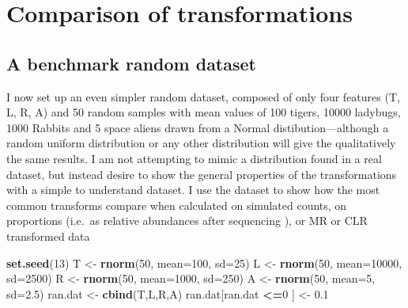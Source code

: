 \documentclass[onecolumn]{book}
\newenvironment{Shaded}{\begin{snugshade}}{\end{snugshade}}
\newcommand{\DataTypeTok}[1]{\textcolor[rgb]{0.13,0.29,0.53}{#1}}
\newcommand{\DecValTok}[1]{\textcolor[rgb]{0.00,0.00,0.81}{#1}}
\newcommand{\FloatTok}[1]{\textcolor[rgb]{0.00,0.00,0.81}{#1}}
\newcommand{\KeywordTok}[1]{\textcolor[rgb]{0.13,0.29,0.53}{\textbf{#1}}}
\newcommand{\NormalTok}[1]{#1}
\newcommand{\OperatorTok}[1]{\textcolor[rgb]{0.81,0.36,0.00}{\textbf{#1}}}
\newcommand{\StringTok}[1]{\textcolor[rgb]{0.31,0.60,0.02}{#1}}
\theoremstyle{definition}
\theoremstyle{definition}
\theoremstyle{definition}
\theoremstyle{remark}
\begin{document}
\hypertarget{comparison-of-transformations}{%
\section{Comparison of
transformations}\label{comparison-of-transformations}}

\hypertarget{a-benchmark-random-dataset}{%
\subsection{A benchmark random
dataset}\label{a-benchmark-random-dataset}}

I now set up an even simpler random dataset, composed of only four
features (T, L, R, A) and 50 random samples with mean values of 100
tigers, 10000 ladybugs, 1000 Rabbits and 5 space aliens drawn from a
Normal distibution---although a random uniform distribution or any other
distribution will give the qualitatively the same results. I am not
attempting to mimic a distribution found in a real dataset, but instead
desire to show the general properties of the transformations with a
simple to understand dataset. I use the dataset to show how the most
common transforms compare when calculated on simulated counts, on
proportions (i.e.~as relative abundances after sequencing ), or MR or
CLR transformed data

\begin{Shaded}
\begin{Highlighting}[]
\KeywordTok{set.seed}\NormalTok{(}\DecValTok{13}\NormalTok{)}
\NormalTok{T <-}\StringTok{ }\KeywordTok{rnorm}\NormalTok{(}\DecValTok{50}\NormalTok{, }\DataTypeTok{mean=}\DecValTok{100}\NormalTok{, }\DataTypeTok{sd=}\DecValTok{25}\NormalTok{)}
\NormalTok{L <-}\StringTok{ }\KeywordTok{rnorm}\NormalTok{(}\DecValTok{50}\NormalTok{, }\DataTypeTok{mean=}\DecValTok{10000}\NormalTok{, }\DataTypeTok{sd=}\DecValTok{2500}\NormalTok{)}
\NormalTok{R <-}\StringTok{ }\KeywordTok{rnorm}\NormalTok{(}\DecValTok{50}\NormalTok{, }\DataTypeTok{mean=}\DecValTok{1000}\NormalTok{, }\DataTypeTok{sd=}\DecValTok{250}\NormalTok{)}
\NormalTok{A <-}\StringTok{ }\KeywordTok{rnorm}\NormalTok{(}\DecValTok{50}\NormalTok{, }\DataTypeTok{mean=}\DecValTok{5}\NormalTok{, }\DataTypeTok{sd=}\FloatTok{2.5}\NormalTok{)}
\NormalTok{ran.dat <-}\StringTok{ }\KeywordTok{cbind}\NormalTok{(T,L,R,A)}
\NormalTok{ran.dat[ran.dat }\OperatorTok{<=}\DecValTok{0}\NormalTok{ ] <-}\StringTok{ }\FloatTok{0.1}
\end{Highlighting}
\end{Shaded}
\end{document}
